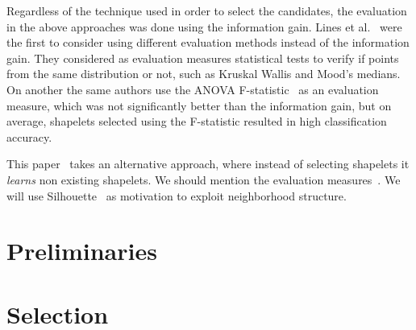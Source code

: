 \documentclass[sigconf, nonacm]{acmart}
\begin{document}
Regardless of the technique used in order to select the candidates, the 
evaluation in the above approaches was done using the information gain.
Lines et al.~\cite{alternative_measures} were the first to consider using
different evaluation methods instead of the information gain. They considered
as evaluation measures statistical tests to verify if points from the same
distribution or not, such as Kruskal Wallis and Mood's medians. On another 
the same authors use the ANOVA F-statistic~\cite{shapelet_transform} as an 
evaluation measure, which was not significantly better than the information 
gain, but on average, shapelets selected using the F-statistic resulted in high
classification accuracy.


This paper~\cite{learning_shapelets} takes an alternative approach, where 
instead of selecting shapelets it \emph{learns} non existing shapelets.
We should mention the evaluation measures~\cite{alternative_measures}.
We will use Silhouette~\cite{silhouettes} as motivation to exploit neighborhood
structure.


\section{Preliminaries}


\section{Selection}








\end{document}
